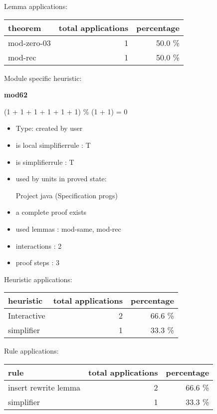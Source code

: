 \documentclass[a4paper]{article}
\begin{document}
Lemma applications:

\begin{supertabular}{l|r|r}
theorem	        & total applications & percentage \\ \hline
mod-zero-03 & 1 & 50.0 \% \\
mod-rec & 1 & 50.0 \% \\

\end{supertabular}

Module specific heuristic:

\pagebreak

{\LARGE\bf mod62}\label{lemma-mod62}

\medskip

 \Fol (1 + 1 + 1 + 1 + 1 + 1) \% (1 + 1) = 0

\begin{itemize}

\item Type: created by user

\item is local simplifierrule : T
\item is simplifierrule : T
\item used by units in proved state:

Project java (Specification progs)
\item       a complete proof exists
\item       used lemmas  : mod-same, mod-rec
\item       interactions : 2
\item       proof steps  : 3
\end{itemize}

\medskip


Heuristic applications:

\begin{supertabular}{l|r|r}
heuristic	& total applications & percentage \\ \hline
Interactive & 2 & 66.6 \% \\
simplifier & 1 & 33.3 \% \\

\end{supertabular}

Rule applications:

\begin{supertabular}{l|r|r}
rule	        & total applications & percentage \\ \hline
insert rewrite lemma & 2 & 66.6 \% \\
simplifier & 1 & 33.3 \% \\

\end{supertabular}
\end{document}
